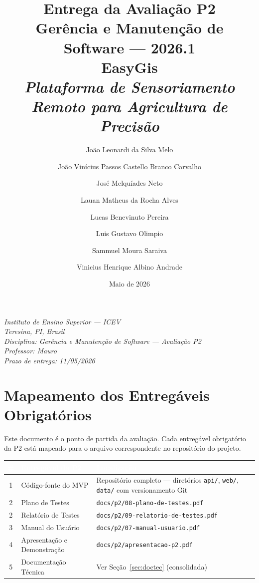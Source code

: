 \documentclass[11pt, a4paper]{article}
\title{%
  \vspace{-1.5cm}
  {\Huge\bfseries\color{accentdim} Entrega da Avaliação P2}\\[8pt]
  {\Large\bfseries Gerência e Manutenção de Software --- 2026.1}\\[18pt]
  {\large EasyGis}\\[4pt]
  {\normalsize\itshape Plataforma de Sensoriamento Remoto para Agricultura de Precisão}
}
\author{%
  João Leonardi da Silva Melo \and João Vinícius Passos Castello Branco Carvalho\\
  \and José Melquíades Neto \and Lauan Matheus da Rocha Alves\\
  \and Lucas Benevinuto Pereira \and Luis Gustavo Olimpio\\
  \and Sammuel Moura Saraiva \and Vinicius Henrique Albino Andrade
}
\date{Maio de 2026}
\begin{document}
\maketitle
\thispagestyle{empty}

\vfill
\begin{center}
\small\textit{Instituto de Ensino Superior --- ICEV}\\
\small\textit{Teresina, PI, Brasil}\\[6pt]
\small\textit{Disciplina: Gerência e Manutenção de Software --- Avaliação P2}\\
\small\textit{Professor: Mauro}\\
\small\textit{Prazo de entrega: 11/05/2026}
\end{center}
\newpage

\tableofcontents
\newpage

\section{Mapeamento dos Entregáveis Obrigatórios}

Este documento é o ponto de partida da avaliação. Cada entregável obrigatório da P2 está mapeado para o arquivo correspondente no repositório do projeto.

\renewcommand{\arraystretch}{1.4}
\begin{table}[H]
\centering
\small
{}
\begin{tabularx}{\textwidth}{@{}clX@{}}
\toprule
\rowcolor{tabheader}\textcolor{white}{\textbf{\#}} & \textcolor{white}{\textbf{Entregável da P2}} & \textcolor{white}{\textbf{Localização}}\\
\midrule
1 & Código-fonte do MVP & Repositório completo --- diretórios \texttt{api/}, \texttt{web/}, \texttt{data/} com versionamento Git\\
2 & Plano de Testes & \texttt{docs/p2/08-plano-de-testes.pdf}\\
2 & Relatório de Testes & \texttt{docs/p2/09-relatorio-de-testes.pdf}\\
3 & Manual do Usuário & \texttt{docs/p2/07-manual-usuario.pdf}\\
4 & Apresentação e Demonstração & \texttt{docs/p2/apresentacao-p2.pdf}\\
5 & Documentação Técnica & Ver Seção~\ref{sec:doctec} (consolidada)\\
\bottomrule
\end{tabularx}
\end{table}
\end{document}
